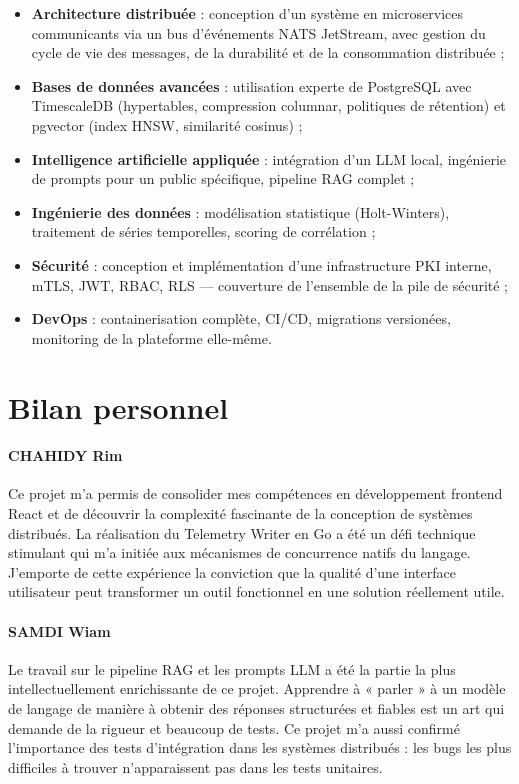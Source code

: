 \begin{itemize}
  \item \textbf{Architecture distribuée} : conception d'un système en microservices
    communicants via un bus d'événements NATS JetStream, avec gestion du cycle
    de vie des messages, de la durabilité et de la consommation distribuée ;
  \item \textbf{Bases de données avancées} : utilisation experte de PostgreSQL
    avec TimescaleDB (hypertables, compression columnar, politiques de rétention)
    et pgvector (index HNSW, similarité cosinus) ;
  \item \textbf{Intelligence artificielle appliquée} : intégration d'un LLM local,
    ingénierie de prompts pour un public spécifique, pipeline RAG complet ;
  \item \textbf{Ingénierie des données} : modélisation statistique (Holt-Winters),
    traitement de séries temporelles, scoring de corrélation ;
  \item \textbf{Sécurité} : conception et implémentation d'une infrastructure
    PKI interne, mTLS, JWT, RBAC, RLS --- couverture de l'ensemble de la pile
    de sécurité ;
  \item \textbf{DevOps} : containerisation complète, CI/CD, migrations versionées,
    monitoring de la plateforme elle-même.
\end{itemize}

\section{Bilan personnel}

\paragraph{CHAHIDY Rim}
Ce projet m'a permis de consolider mes compétences en développement frontend
React et de découvrir la complexité fascinante de la conception de systèmes
distribués. La réalisation du Telemetry Writer en Go a été un défi technique
stimulant qui m'a initiée aux mécanismes de concurrence natifs du langage.
J'emporte de cette expérience la conviction que la qualité d'une interface
utilisateur peut transformer un outil fonctionnel en une solution réellement
utile.

\paragraph{SAMDI Wiam}
Le travail sur le pipeline RAG et les prompts LLM a été la partie la plus
intellectuellement enrichissante de ce projet. Apprendre à « parler » à un
modèle de langage de manière à obtenir des réponses structurées et fiables est
un art qui demande de la rigueur et beaucoup de tests. Ce projet m'a aussi
confirmé l'importance des tests d'intégration dans les systèmes distribués :
les bugs les plus difficiles à trouver n'apparaissent pas dans les tests
unitaires.

